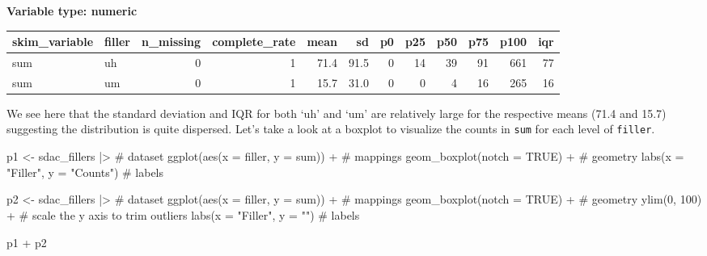 \documentclass[
  letterpaper,
]{latex/krantz}
\newenvironment{Shaded}{\begin{snugshade}}{\end{snugshade}}
\newcommand{\AttributeTok}[1]{\textcolor[rgb]{0.40,0.45,0.13}{#1}}
\newcommand{\CommentTok}[1]{\textcolor[rgb]{0.37,0.37,0.37}{#1}}
\newcommand{\ConstantTok}[1]{\textcolor[rgb]{0.56,0.35,0.01}{#1}}
\newcommand{\DecValTok}[1]{\textcolor[rgb]{0.68,0.00,0.00}{#1}}
\newcommand{\FunctionTok}[1]{\textcolor[rgb]{0.28,0.35,0.67}{#1}}
\newcommand{\NormalTok}[1]{\textcolor[rgb]{0.00,0.23,0.31}{#1}}
\newcommand{\OtherTok}[1]{\textcolor[rgb]{0.00,0.23,0.31}{#1}}
\newcommand{\SpecialCharTok}[1]{\textcolor[rgb]{0.37,0.37,0.37}{#1}}
\newcommand{\StringTok}[1]{\textcolor[rgb]{0.13,0.47,0.30}{#1}}
\begin{document}
\textbf{Variable type: numeric}

\begin{tabular}{l|l|r|r|r|r|r|r|r|r|r|r}
\hline
skim\_variable & filler & n\_missing & complete\_rate & mean & sd & p0 & p25 & p50 & p75 & p100 & iqr\\
\hline
sum & uh & 0 & 1 & 71.4 & 91.5 & 0 & 14 & 39 & 91 & 661 & 77\\
\hline
sum & um & 0 & 1 & 15.7 & 31.0 & 0 & 0 & 4 & 16 & 265 & 16\\
\hline
\end{tabular}

We see here that the standard deviation and IQR for both `uh' and `um'
are relatively large for the respective means (71.4 and 15.7) suggesting
the distribution is quite dispersed. Let's take a look at a boxplot to
visualize the counts in \texttt{sum} for each level of \texttt{filler}.

\begin{Shaded}
\begin{Highlighting}[]
\NormalTok{p1 }\OtherTok{\textless{}{-}} 
\NormalTok{  sdac\_fillers }\SpecialCharTok{|\textgreater{}} \CommentTok{\# dataset}
  \FunctionTok{ggplot}\NormalTok{(}\FunctionTok{aes}\NormalTok{(}\AttributeTok{x =}\NormalTok{ filler, }\AttributeTok{y =}\NormalTok{ sum)) }\SpecialCharTok{+} \CommentTok{\# mappings}
  \FunctionTok{geom\_boxplot}\NormalTok{(}\AttributeTok{notch =} \ConstantTok{TRUE}\NormalTok{) }\SpecialCharTok{+} \CommentTok{\# geometry}
  \FunctionTok{labs}\NormalTok{(}\AttributeTok{x =} \StringTok{"Filler"}\NormalTok{, }\AttributeTok{y =} \StringTok{"Counts"}\NormalTok{) }\CommentTok{\# labels}

\NormalTok{p2 }\OtherTok{\textless{}{-}} 
\NormalTok{  sdac\_fillers }\SpecialCharTok{|\textgreater{}} \CommentTok{\# dataset}
  \FunctionTok{ggplot}\NormalTok{(}\FunctionTok{aes}\NormalTok{(}\AttributeTok{x =}\NormalTok{ filler, }\AttributeTok{y =}\NormalTok{ sum)) }\SpecialCharTok{+} \CommentTok{\# mappings}
  \FunctionTok{geom\_boxplot}\NormalTok{(}\AttributeTok{notch =} \ConstantTok{TRUE}\NormalTok{) }\SpecialCharTok{+} \CommentTok{\# geometry}
  \FunctionTok{ylim}\NormalTok{(}\DecValTok{0}\NormalTok{, }\DecValTok{100}\NormalTok{) }\SpecialCharTok{+} \CommentTok{\# scale the y axis to trim outliers}
  \FunctionTok{labs}\NormalTok{(}\AttributeTok{x =} \StringTok{"Filler"}\NormalTok{, }\AttributeTok{y =} \StringTok{""}\NormalTok{) }\CommentTok{\# labels}

\NormalTok{p1 }\SpecialCharTok{+}\NormalTok{ p2}
\end{Highlighting}
\end{Shaded}
\end{document}
